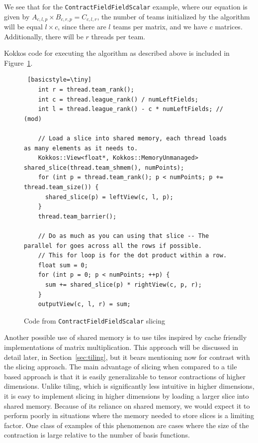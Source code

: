 We see that for the \texttt{ContractFieldFieldScalar} example, where our equation is given by
$A_{c,l,p} \times B_{c, r, p} = C_{c,l, r}$, the
number of teams initialized by the algorithm will be equal $l \times c$,
since there are $l$ teams per matrix, and we have $c$ matrices.
Additionally, there will be $r$ threads per team. 


    Kokkos code for executing the algorithm as described above is included in Figure~\ref{lst:ContractFieldFieldScalarSlice}. 

\begin{figure}[ht]
    \begin{lstlisting} [basicstyle=\tiny]
    int r = thread.team_rank();
    int c = thread.league_rank() / numLeftFields;
    int l = thread.league_rank() - c * numLeftFields; // (mod)

    // Load a slice into shared memory, each thread loads as many elements as it needs to.
    Kokkos::View<float*, Kokkos::MemoryUnmanaged> shared_slice(thread.team_shmem(), numPoints);
    for (int p = thread.team_rank(); p < numPoints; p += thread.team_size()) {
      shared_slice(p) = leftView(c, l, p);
    }
    thread.team_barrier();

    // Do as much as you can using that slice -- The parallel for goes across all the rows if possible.
    // This for loop is for the dot product within a row.
    float sum = 0;
    for (int p = 0; p < numPoints; ++p) {
      sum += shared_slice(p) * rightView(c, p, r);
    }
    outputView(c, l, r) = sum;

   \end{lstlisting}
\caption{Code from \texttt{ContractFieldFieldScalar} slicing
\label{lst:ContractFieldFieldScalarSlice}} 
\end{figure}

Another possible use of shared memory is to use tiles inspired by cache friendly
implementations of matrix multiplication. This approach will be discussed in
detail later, in Section~\ref{sec:tiling}, but it bears mentioning now for
contrast with the slicing approach.  The main advantage of slicing when compared
to a tile based approach is that it is easily generalizable to tensor
contractions of higher dimensions. Unlike tiling, which is significantly less
intuitive in higher dimensions, it is easy to implement slicing in higher
dimensions by loading a larger slice into shared memory.  Because of its
reliance on shared memory, we would expect it to perform poorly in situations
where the memory needed to store slices is a limiting factor. One class of
examples of this phenomenon are cases where the size of the contraction is large
relative to the number of basis functions. 

